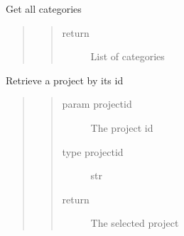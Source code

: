 \documentclass[letterpaper,10pt,english]{sphinxmanual}
\begin{document}
\begin{fulllineitems}
\label{\detokenize{index:models.project.get_categories}}
Get all categories
\begin{quote}
\begin{quote}\begin{description}
\item[{return}] \leavevmode
List of categories

\end{description}\end{quote}
\end{quote}

\end{fulllineitems}


\begin{fulllineitems}
\label{\detokenize{index:models.project.get_project_by_id}}
Retrieve a project by its id
\begin{quote}
\begin{quote}\begin{description}
\item[{param projectid}] \leavevmode
The project id

\item[{type projectid}] \leavevmode
str

\item[{return}] \leavevmode
The selected project

\end{description}\end{quote}
\end{quote}

\end{fulllineitems}

\end{document}
